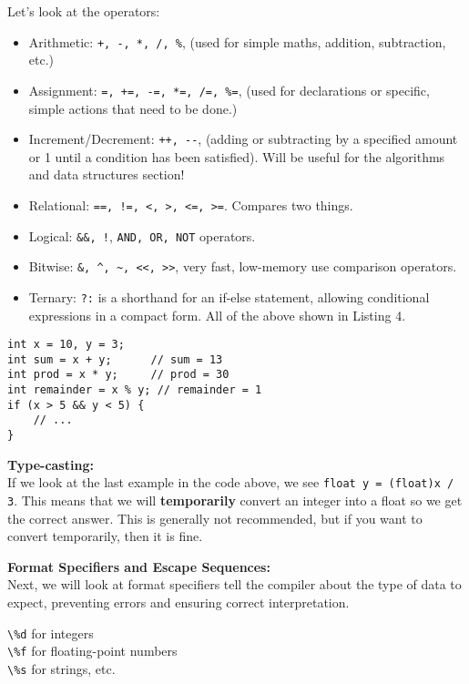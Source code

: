 \documentclass[a4paper,12pt]{article}
\begin{document}
\newpage

Let's look at the operators:

\begin{itemize}
    \item Arithmetic: \verb|+, -, *, /, %|, (used for simple maths, addition, subtraction, etc.)
    \item Assignment: \verb|=, +=, -=, *=, /=, %=|, (used for declarations or specific, simple actions that need to be done.)
    \item Increment/Decrement: \verb|++, --|, (adding or subtracting by a specified amount or 1 until a condition has been satisfied). Will be useful for the algorithms and data structures section!
    \item Relational: \verb|==, !=, <, >, <=, >=|. Compares two things.
    \item Logical: \verb|&&, !|, \verb|AND, OR, NOT| operators.
    \item Bitwise: \verb|&, ^, ~, <<, >>|, very fast, low-memory use comparison operators.
    \item Ternary: \verb|?:| is a shorthand for an if-else statement, allowing conditional expressions in a compact form. All of the above shown in Listing 4.
\end{itemize}

\begin{lstlisting}[caption=Example output]
int x = 10, y = 3;
int sum = x + y;      // sum = 13
int prod = x * y;     // prod = 30
int remainder = x % y; // remainder = 1
if (x > 5 && y < 5) {
    // ...
}\end{lstlisting}

\textbf{Type-casting:}\\
If we look at the last example in the code above, we see \verb|float y = (float)x / 3|. This means that we will \textbf{temporarily} convert an integer into a float so we get the correct answer. This is generally not recommended, but if you want to convert temporarily, then it is fine.

\textbf{Format Specifiers and Escape Sequences:}\\
Next, we will look at format specifiers tell the compiler about the type of data to expect, preventing errors and ensuring correct interpretation.

\verb|\%d| for integers\\
\verb|\%f| for floating-point numbers\\
\verb|\%s| for strings, etc.\\
\end{document}
